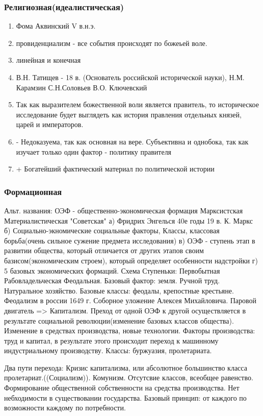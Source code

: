 \documentclass[a4paper]{article}
\begin{document}
\subsubsection{Религиозная(идеалистическая)}
\begin{enumerate}
\item Фома Аквинский V в.н.э.
\item провиденциализм - все события происходят по божеьей воле.
\item линейная и конечная
\item В.Н. Татищев - 18 в. (Основатель российской исторической науки),
Н.М. Карамзин
С.Н.Соловьев
В.О. Ключевский
\item Так как выразителем божественной воли является правитель, то историческое исследование будет выглядеть как история правления отдельных князей, царей и императоров.
\item - Недоказуема, так как основная на вере. Субъективна и однобока, так как изучает только один фактор - политику правителя
\item + Богатейший фактический материал по политической истории
    
\end{enumerate}

\subsubsection{Формационная}
Альт. названия:
    ОЭФ - общественно-экономическая формация
    Марксистская
    Материалистическая
    "Советская"
а) Фридрих Энгелься 40е годы 19 в.
К. Маркс 
б) Социально-экномические социальные факторы,
   Классы, классовая борьба(очень сильное сужение предмета исследования)
в) ОЭФ - ступень этап в развитии общества, который отличается от других этапов своим базисом(экономическим строем), который определяет особенности надстройки 
г) 5 базовых экономических формаций. Схема Ступеньки:
Первобытная
Рабовладельческая
Феодальная. Базовый фактор: земля. Ручной труд. Натуральное хозяйство. Базовые классы: феодалы, крепостные крестьяне.
Феодализм в россии 1649 г. Соборное уложение Алексея Михайловича.
Паровой двигатель => Капитализм. Преход от одной ОЭФ к другой осуществляется в результате социальной революции(изменение базовых классов общества). Изменение в средствах производства, новые технологии. Факторы производства: труд и капитал, в результате этого происходит переход к машинному индустриальному производству. Классы: буржуазия, пролетариата.

Два пути перехода: Кризис капитализма, или абсолютное большинство класса пролетариат.((Социализм)). Комунизм. Отсутсвие классов, всеобщее равенство. Формирование общественной собственности на средства производства. Нет небходимости в существовании государства. Базовый принцип: от каждого по возможности каждому по потребности.
\end{document}

